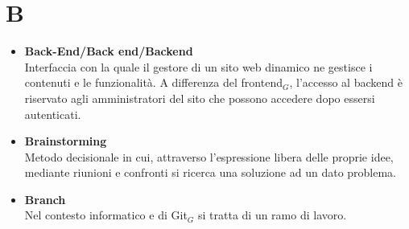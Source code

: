 \chapter{B} \label{B}
\begin{itemize}
	\item \textbf{Back-End/Back end/Backend} \\
	Interfaccia con la quale il gestore di un sito web dinamico ne gestisce i contenuti e le funzionalità. A differenza del frontend$_G$, l'accesso al backend è riservato agli amministratori del sito che possono accedere dopo essersi autenticati.
	
	\item \textbf{Brainstorming} \\
	Metodo decisionale in cui, attraverso l’espressione libera delle proprie idee, mediante riunioni e confronti si ricerca una soluzione ad un dato problema.
	
	\item \textbf{Branch} \\
	Nel contesto informatico e di Git$_G$ si tratta di un ramo di lavoro.
\end{itemize}
